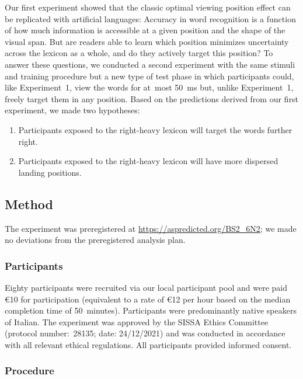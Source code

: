 \documentclass[doc,biblatex]{apa7}
\begin{document}
Our first experiment showed that the classic optimal viewing position effect \parencite[e.g.,][]{Brysbaert:1996} can be replicated with artificial languages: Accuracy in word recognition is a function of how much information is accessible at a given position and the shape of the visual span. But are readers able to learn which position minimizes uncertainty across the lexicon as a whole, and do they actively target this position? To answer these questions, we conducted a second experiment with the same stimuli and training procedure but a new type of test phase in which participants could, like Experiment~1, view the words for at~most 50~ms but, unlike Experiment~1, freely target them in any position. Based on the predictions derived from our first experiment, we made two hypotheses:
\begin{enumerate}
    \item Participants exposed to the right-heavy lexicon will target the words further right.
    \item Participants exposed to the right-heavy lexicon will have more dispersed landing positions.
\end{enumerate}

\subsection{Method}

The experiment was preregistered at \url{https://aspredicted.org/BS2_6N2}; we made no deviations from the preregistered analysis plan.

\subsubsection{Participants}

Eighty participants were recruited via our local participant pool and were paid €10 for participation (equivalent to a rate of €12 per hour based on the median completion time of 50~minutes). Participants were predominantly native speakers of Italian. The experiment was approved by the SISSA Ethics Committee (protocol number:~28135; date: 24/12/2021) and was conducted in accordance with all relevant ethical regulations. All participants provided informed consent.

\subsubsection{Procedure}
\end{document}
